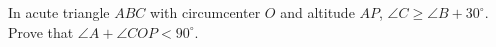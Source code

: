 In acute triangle $ABC$ with circumcenter $O$ and altitude $AP$, $\angle C \geq \angle B + 30^\circ$. Prove that $\angle A + \angle COP < 90^\circ$.
